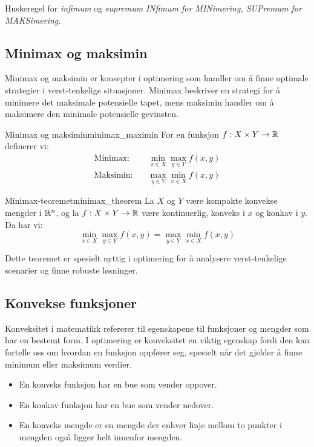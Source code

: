 \begin{remark}{Huskeregel for \emph{infimum} og \emph{supremum}}{}
	\textit{INfimum for MINimering, SUPremum for MAKSimering.}
\end{remark}

\subsection{Minimax og maksimin}
Minimax og maksimin er konsepter i optimering som handler om å finne optimale strategier i verst-tenkelige situasjoner.
Minimax beskriver en strategi for å minimere det maksimale potensielle tapet, mens maksimin handler om å maksimere den minimale potensielle gevinsten.

\begin{definition}{Minimax og maksimin}{minimax_maximin}
	For en funksjon $f: X \times Y \to \mathbb{R}$ definerer vi:
	\begin{align*}
		\text{Minimax:}  & \quad \min_{x \in X} \max_{y \in Y} f(x,y) \\
		\text{Maksimin:} & \quad \max_{y \in Y} \min_{x \in X} f(x,y)
	\end{align*}
\end{definition}

\begin{theorem}{Minimax-teoremet}{minimax_theorem}
	La $X$ og $Y$ være kompakte konvekse mengder i $\mathbb{R}^n$, og la $f: X \times Y \to \mathbb{R}$ være kontinuerlig, konveks i $x$ og konkav i $y$. Da har vi:
	\[
		\min_{x \in X} \max_{y \in Y} f(x,y) = \max_{y \in Y} \min_{x \in X} f(x,y)
	\]
\end{theorem}

Dette teoremet er spesielt nyttig i optimering for å analysere verst-tenkelige scenarier og finne robuste løsninger.

\subsection{Konvekse funksjoner}
Konveksitet i matematikk refererer til egenskapene til funksjoner og mengder som har en bestemt form.
I optimering er konveksitet en viktig egenskap fordi den kan fortelle oss om hvordan en funksjon oppfører seg, spesielt når det gjelder å finne minimum eller maksimum verdier.

\begin{itemize}
	\item En konveks funksjon har en bue som vender oppover.
	\item En konkav funksjon har en bue som vender nedover.
	\item En konveks mengde er en mengde der enhver linje mellom to punkter i mengden også ligger helt innenfor mengden.
\end{itemize}

